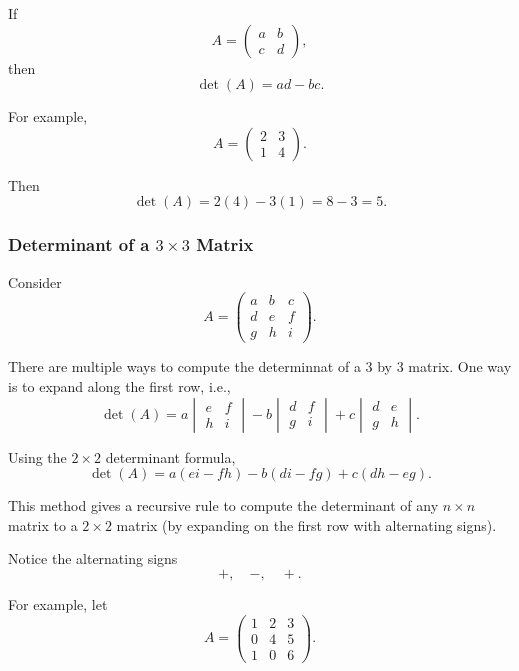 \documentclass[11pt]{article}
\theoremstyle{definition}
\theoremstyle{plain}
\theoremstyle{remark}
\begin{document}
If
\[
A=
\begin{pmatrix}
a&b\\
c&d
\end{pmatrix},
\]
then
\[
{
\det(A)=ad-bc.
}
\]

For example,
\[
A=
\begin{pmatrix}
2&3\\
1&4
\end{pmatrix}.
\]

Then
\[
\det(A)
=
2(4)-3(1)
=
8-3
=
5.
\]


\subsubsection*{Determinant of a $3\times3$ Matrix}

Consider
\[
A=
\begin{pmatrix}
a&b&c\\
d&e&f\\
g&h&i
\end{pmatrix}.
\]

There are multiple ways to compute the determinnat of a 3 by 3 matrix. One way is to expand along the first row, i.e.,
\[
\det(A)
=
a
\begin{vmatrix}
e&f\\
h&i
\end{vmatrix}
-
b
\begin{vmatrix}
d&f\\
g&i
\end{vmatrix}
+
c
\begin{vmatrix}
d&e\\
g&h
\end{vmatrix}.
\]

Using the $2\times2$ determinant formula,
\[
{
\det(A)
=
a(ei-fh)
-
b(di-fg)
+
c(dh-eg).
}
\]

This method gives a recursive rule to compute the determinant of any $n\times n$ matrix to a $2\times 2$ matrix (by expanding on the first row with alternating signs).

Notice the alternating signs
\[
+,\quad -,\quad +.
\]

For example, let
\[
A=
\begin{pmatrix}
1&2&3\\
0&4&5\\
1&0&6
\end{pmatrix}.
\]
\end{document}
